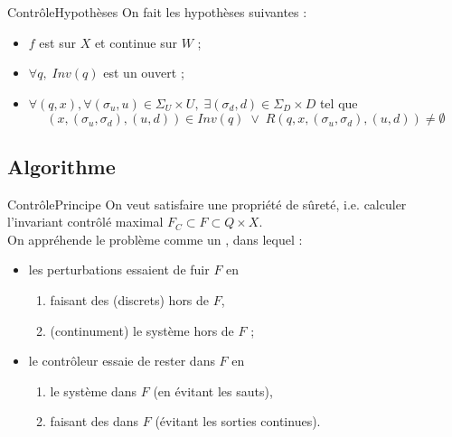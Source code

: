 \documentclass[compress]{beamer}
\begin{document}
\begin{frame}{Contrôle}{Hypothèses}
On fait les hypothèses suivantes :
\begin{itemize}
\item $f$ est  sur $X$ et continue sur $W$ ;
\item $\forall q, \; Inv(q)$ est un ouvert ;
\item $\forall (q, x), \forall (\sigma_u, u) \in \Sigma_U \times U, \; 
	\exists (\sigma_d, d) \in \Sigma_D \times D$ tel que
	$$(x, (\sigma_u, \sigma_d), (u, d)) \in Inv(q) \; \vee \; R(q, x, (\sigma_u, \sigma_d), (u, d)) \neq \emptyset$$
\end{itemize}
\end{frame}

\subsection{Algorithme}
\begin{frame}{Contrôle}{Principe}
On veut satisfaire une propriété de sûreté, i.e. calculer l'invariant contrôlé maximal $F_C \subset F \subset Q \times X$.\\
On appréhende le problème comme un , dans lequel :
\begin{itemize}
\item les perturbations essaient de fuir $F$ en
	\begin{enumerate}
	\item faisant des  (discrets) hors de $F$,
	\item {} (continument) le système hors de $F$ ;
	\end{enumerate}
\item le contrôleur essaie de rester dans $F$ en
	\begin{enumerate}
	\item {} le système dans $F$ (en évitant les sauts),
	\item faisant des  dans $F$ (évitant les sorties continues).
	\end{enumerate}
\end{itemize}
\end{frame}
\end{document}
